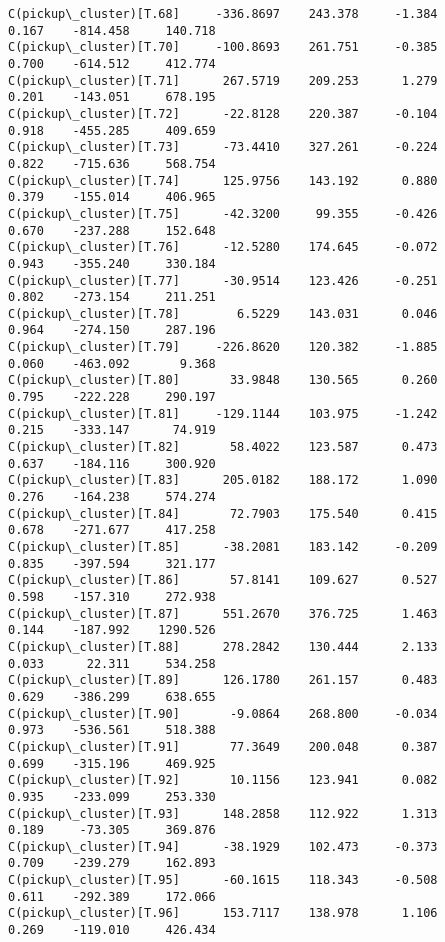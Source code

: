 \documentclass[11pt]{article}
\begin{document}
\begin{Verbatim}[commandchars=\\\{\}]
C(pickup\_cluster)[T.68]     -336.8697    243.378     -1.384      0.167    -814.458     140.718
C(pickup\_cluster)[T.70]     -100.8693    261.751     -0.385      0.700    -614.512     412.774
C(pickup\_cluster)[T.71]      267.5719    209.253      1.279      0.201    -143.051     678.195
C(pickup\_cluster)[T.72]      -22.8128    220.387     -0.104      0.918    -455.285     409.659
C(pickup\_cluster)[T.73]      -73.4410    327.261     -0.224      0.822    -715.636     568.754
C(pickup\_cluster)[T.74]      125.9756    143.192      0.880      0.379    -155.014     406.965
C(pickup\_cluster)[T.75]      -42.3200     99.355     -0.426      0.670    -237.288     152.648
C(pickup\_cluster)[T.76]      -12.5280    174.645     -0.072      0.943    -355.240     330.184
C(pickup\_cluster)[T.77]      -30.9514    123.426     -0.251      0.802    -273.154     211.251
C(pickup\_cluster)[T.78]        6.5229    143.031      0.046      0.964    -274.150     287.196
C(pickup\_cluster)[T.79]     -226.8620    120.382     -1.885      0.060    -463.092       9.368
C(pickup\_cluster)[T.80]       33.9848    130.565      0.260      0.795    -222.228     290.197
C(pickup\_cluster)[T.81]     -129.1144    103.975     -1.242      0.215    -333.147      74.919
C(pickup\_cluster)[T.82]       58.4022    123.587      0.473      0.637    -184.116     300.920
C(pickup\_cluster)[T.83]      205.0182    188.172      1.090      0.276    -164.238     574.274
C(pickup\_cluster)[T.84]       72.7903    175.540      0.415      0.678    -271.677     417.258
C(pickup\_cluster)[T.85]      -38.2081    183.142     -0.209      0.835    -397.594     321.177
C(pickup\_cluster)[T.86]       57.8141    109.627      0.527      0.598    -157.310     272.938
C(pickup\_cluster)[T.87]      551.2670    376.725      1.463      0.144    -187.992    1290.526
C(pickup\_cluster)[T.88]      278.2842    130.444      2.133      0.033      22.311     534.258
C(pickup\_cluster)[T.89]      126.1780    261.157      0.483      0.629    -386.299     638.655
C(pickup\_cluster)[T.90]       -9.0864    268.800     -0.034      0.973    -536.561     518.388
C(pickup\_cluster)[T.91]       77.3649    200.048      0.387      0.699    -315.196     469.925
C(pickup\_cluster)[T.92]       10.1156    123.941      0.082      0.935    -233.099     253.330
C(pickup\_cluster)[T.93]      148.2858    112.922      1.313      0.189     -73.305     369.876
C(pickup\_cluster)[T.94]      -38.1929    102.473     -0.373      0.709    -239.279     162.893
C(pickup\_cluster)[T.95]      -60.1615    118.343     -0.508      0.611    -292.389     172.066
C(pickup\_cluster)[T.96]      153.7117    138.978      1.106      0.269    -119.010     426.434

\end{Verbatim}
\end{document}
